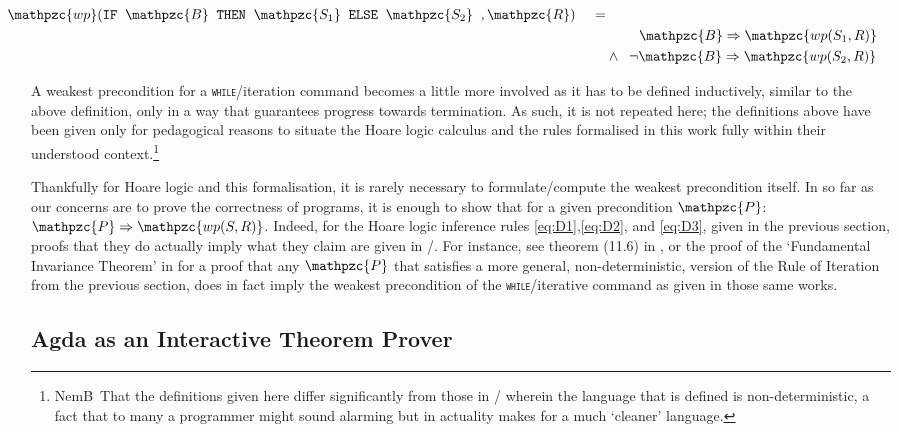 \documentclass[oneside,12pt]{article}
\newcommand\NB[1][0.1]{N\kern-#1emB \,} %
\newcommand{\impcode}[1]{\textsc{\texttt{#1}}}
\newcommand{\textM}[1]{\ensuremath{\mathpzc{#1}}}
\begin{document}
\begin{centering}
  \begin{equation}
    \label{eq:wp-ifelse}
    \begin{aligned}
      \!\!\!\!\!\!\!\!\!\!\!\!\!\!\!\! \textM{wp}( \impcode{IF} \;\; \textM{B} \;\; \impcode{THEN} \;\; \textM{S_1} \;\; \impcode{ELSE} \;\; \textM{S_2} \;\; ,\textM{R}) \;\;\;\; =& \\
      & \;\;\,\;\;\;\;\;\;  \textM{B} \Rightarrow \textM{wp(S_1 , R)} \\
      & \wedge \;\; \neg  \textM{B} \Rightarrow \textM{wp(S_2 , R)}
    \end{aligned}
  \end{equation}
\end{centering} 


A weakest precondition for a \impcode{while}/iteration command becomes a little more involved as it has to be defined inductively, similar to the above definition, only in a way that guarantees progress towards termination. As such, it is not repeated here; the definitions above have been given only for pedagogical reasons to situate the Hoare logic calculus and the rules formalised in this work fully within their understood context.\footnote{\NB That the definitions given here differ significantly from those in \cite{Dijkstra75}/\cite{Dijkstra76} wherein the language that is defined is non-deterministic, a fact that to many a programmer might sound alarming but in actuality makes for a much `cleaner' language.}

Thankfully for Hoare logic and this formalisation, it is rarely necessary to formulate/compute the weakest precondition itself. In so far as our concerns are to prove the correctness of programs, it is enough to show that for a given precondition \textM{P}: $\textM{P} \Rightarrow \textM{wp(S,R)}$. Indeed, for the Hoare logic inference rules \ref{eq:D1},\ref{eq:D2}, and \ref{eq:D3},  given in the previous section, proofs that they do actually imply what they claim are given in \cite{Dijkstra76}/\cite{Gries81}. For instance, see theorem (11.6) in \cite{Gries81}, or the proof of the `Fundamental Invariance Theorem' in \cite{Dijkstra76} for a proof that any \textM{P} that satisfies a more general, non-deterministic, version of the Rule of Iteration from the previous section, does in fact imply the weakest precondition of the \impcode{while}/iterative command as given in those same works.


\subsection{Agda as an Interactive Theorem Prover}
\end{document}
